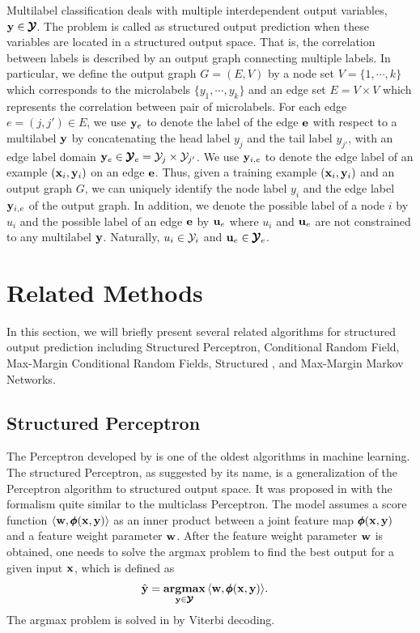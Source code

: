 {Multilabel classification deals with multiple interdependent output variables, $\mathbf {y}\in\pmb {\mathcal{Y}}$.
The problem is called as {structured output prediction} when these variables are located in a structured output space.
That is, the correlation between labels is described by an {output graph} connecting multiple labels.
In particular, we define the output graph $G=(E,V)$ by a node set $V=\{1,\cdots,k\}$ which corresponds to the microlabels $\{y_1,\cdots,y_k\}$ and an edge set $E=V\times V$ which represents the correlation between pair of microlabels.
For each edge $e=(j,j')\in E$, we use $\mathbf {y}_e$ to denote the label of the edge $\mathbf {e}$ with respect to a multilabel $\mathbf {y}$ by concatenating the head label $y_j$ and the tail label $y_{j'}$, with an edge label domain $\mathbf {y}_e\in\pmb {\mathcal{Y}}_e=\mathcal{Y}_j\times\mathcal{Y}_{j'}$.
We use $\mathbf {y}_{i,e}$ to denote the edge label of an example $(\mathbf {x}_i,\mathbf {y}_i)$ on an edge $\mathbf {e}$.
Thus, given a training example $(\mathbf {x}_i,\mathbf {y}_i)$ and an output graph $G$, we can uniquely identify the node label $y_i$ and the edge label $\mathbf {y}_{i,e}$ of the output graph.
In addition, we denote the possible label of a node $i$ by $u_i$ and the possible label of an edge $\mathbf {e}$ by $\mathbf {u}_{e}$ where $u_i$ and $\mathbf {u}_{e}$ are not constrained to any multilabel $\mathbf {y}$.
Naturally, $u_i\in\mathcal{Y}_i$ and $\mathbf {u}_e\in\pmb {\mathcal{Y}}_e$.



%
%
\section{Related Methods}

In this section, we will briefly present several related algorithms for structured output prediction including Structured Perceptron, Conditional Random Field, Max-Margin Conditional Random Fields, Structured \svm, and Max-Margin Markov Networks.



%
%
\subsection{Structured Perceptron}

The Perceptron developed by \citet{Rosenblatt58} is one of the oldest algorithms in machine learning.
The structured Perceptron, as suggested by its name, is a generalization of the Perceptron algorithm to structured output space.
It was proposed in \citep{collins02a, collins02b} with the formalism quite similar to the multiclass Perceptron. 
The model assumes a score function $\langle \mathbf {w}, \pmb \phi(\mathbf {x},\mathbf {y}) \rangle$ as an inner product between a joint feature map $\pmb \phi(\mathbf {x},\mathbf {y})$ and a feature weight parameter $\mathbf {w}$.
After the feature weight parameter $\mathbf {w}$ is obtained, one needs to solve the {argmax} problem to find the best output for a given input $\mathbf {x}$, which is defined as
\begin{align}
	\hat{\mathbf {y}} = \underset{\mathbf {y}\in\pmb {\mathcal{Y}}}{\textbf{argmax}} &\, \langle \mathbf {w}, \pmb \phi(\mathbf {x},\mathbf {y}) \rangle. \label{sp_inference}
\end{align}
The argmax problem is solved in \citep{collins02a} by Viterbi decoding.

}
